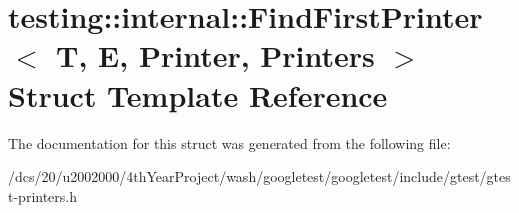 \hypertarget{structtesting_1_1internal_1_1FindFirstPrinter}{}\section{testing\+:\+:internal\+:\+:Find\+First\+Printer$<$ T, E, Printer, Printers $>$ Struct Template Reference}
\label{structtesting_1_1internal_1_1FindFirstPrinter}


The documentation for this struct was generated from the following file\+:\begin{DoxyCompactItemize}
\item 
/dcs/20/u2002000/4th\+Year\+Project/wash/googletest/googletest/include/gtest/gtest-\/printers.\+h\end{DoxyCompactItemize}
